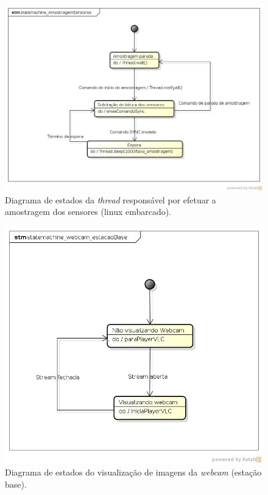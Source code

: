 \begin{figure}[H]
  \centering
  \includegraphics[width=\textwidth, keepaspectratio]{./figuras/sistEmbarcado/statemachine_AmostragemSensores_sistEmbarcado.jpg}
  \caption{Diagrama de estados da \textit{thread} responsável por efetuar a amostragem dos sensores (linux embarcado).}
  \label{fig:diagrama_estados_amostragem_sensores_sist_embarcado}
\end{figure}

\begin{figure}[H]
  \centering
  \includegraphics[width=\textwidth, keepaspectratio]{./figuras/estacaoBase/statemachine_webcam_estacaoBase.jpg}
  \caption{Diagrama de estados do visualização de imagens da \textit{webcam} (estação base).}
  \label{fig:diagrama_estados_webcam_estacao_base}
\end{figure}

